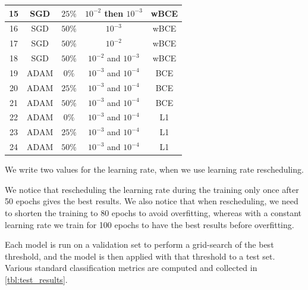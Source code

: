 \documentclass[10pt,conference]{IEEEtran}
\begin{document}
\begin{center}
\begin{tabular}{||c | c  | c | c | c ||}
        \hline
        15 & SGD & $25\% $ & $10^{-2}$ then $10^{-3}$ & wBCE \\
        \hline
        16 & SGD & $50\% $ & $10^{-3}$ & wBCE \\
        \hline
        17 & SGD & $50\% $ & $10^{-2}$ & wBCE \\
        \hline
        18 & SGD & $50\% $ & $10^{-2}$ and $10^{-3}$ & wBCE \\
        \hline
        19 & ADAM & $0\% $ & $10^{-3}$ and $10^{-4}$ & BCE \\
        \hline
        20 & ADAM & $25\% $ & $10^{-3}$ and $10^{-4}$ & BCE \\
        \hline
        21 & ADAM & $50\% $ & $10^{-3}$ and $10^{-4}$ & BCE \\
        \hline
        22 & ADAM & $0\% $ & $10^{-3}$ and $10^{-4}$ & L1 \\
        \hline
        23 & ADAM & $25\% $ & $10^{-3}$ and $10^{-4}$ & L1 \\
        \hline
        24 & ADAM & $50\% $ & $10^{-3}$ and $10^{-4}$ & L1 \\
        \hline
        
        \hline
    \end{tabular}
\end{center}
We write two values for the learning rate, when we use learning rate rescheduling. 

We notice that rescheduling the learning rate during the training only once after 50 epochs gives the best results. We also notice that when rescheduling, we need to shorten the training to 80 epochs to avoid overfitting, whereas with a constant learning rate we train for 100 epochs to have the best results before overfitting.

Each model is run on a validation set to perform a grid-search of the best threshold,
and the model is then applied with that threshold to a test set.
Various standard classification metrics are computed and collected in \autoref{tbl:test_results}.
\end{document}
